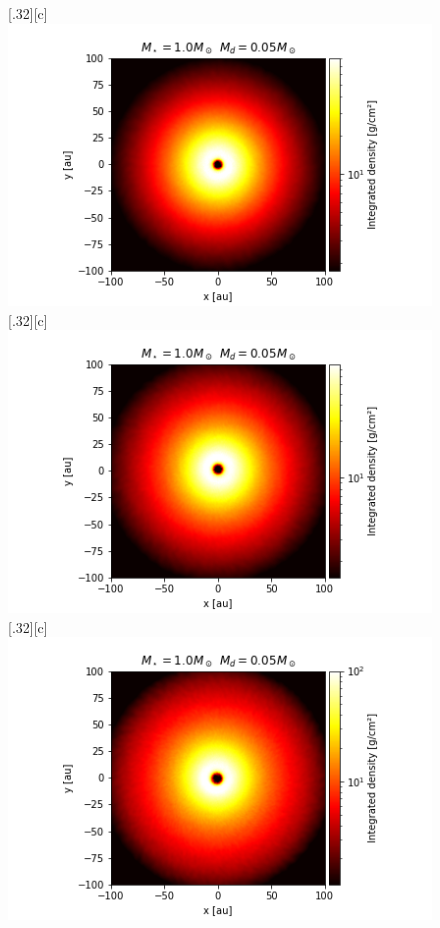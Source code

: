 \documentclass[aps,prb,twocolumn,superscriptaddress,floatfix,longbibliography]{revtex4-2}
\begin{document}
\begin{appendices}
\begin{figure}[!htbp]
  \subcaptionbox*{}[.32\linewidth][c]{%
    \includegraphics[width=1\linewidth]{Graphs_2D/r_1s_0.05d_0.3q_2D.png}}\quad
  \subcaptionbox*{}[.32\linewidth][c]{%
    \includegraphics[width=\linewidth]{Graphs_2D/r_1s_0.05d_0.5q_2D.png}}\quad
  \subcaptionbox*{}[.32\linewidth][c]{%
    \includegraphics[width=\linewidth]{Graphs_2D/r_1s_0.05d_0.7q_2D.png}}\quad    

\end{figure}
\end{appendices}
\end{document}
